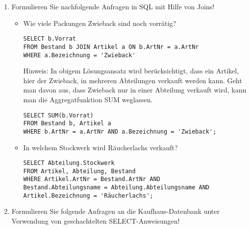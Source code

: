 \documentclass{lehramt-informatik-aufgabe}
\begin{document}
\begin{enumerate}


\item Formulieren Sie nachfolgende Anfragen in SQL mit Hilfe von Joins!

\begin{itemize}


\item Wie viele Packungen Zwieback sind noch vorrätig?

\begin{antwort}[richtig]
\begin{verbatim}
SELECT b.Vorrat
FROM Bestand b JOIN Artikel a ON b.ArtNr = a.ArtNr
WHERE a.Bezeichnung = 'Zwieback'
\end{verbatim}
\end{antwort}

\begin{antwort}[muster]
Hinweis: In obigem Lösungsansatz wird berücksichtigt, dass ein Artikel,
hier der Zwieback, in mehreren Abteilungen verkauft werden kann. Geht
man davon aus, dass Zwieback nur in einer Abteilung verkauft wird, kann
man die Aggregatfunktion SUM weglassen.
\begin{verbatim}
SELECT SUM(b.Vorrat)
FROM Bestand b, Artikel a
WHERE b.ArtNr = a.ArtNr AND a.Bezeichnung = 'Zwieback';
\end{verbatim}
\end{antwort}


\item In welchem Stockwerk wird Räucherlachs verkauft?

\begin{antwort}[muster]
\begin{verbatim}
SELECT Abteilung.Stockwerk
FROM Artikel, Abteilung, Bestand
WHERE Artikel.ArtNr = Bestand.ArtNr AND
Bestand.Abteilungsname = Abteilung.Abteilungsname AND
Artikel.Bezeichnung = 'Räucherlachs';
\end{verbatim}
\end{antwort}

\end{itemize}


\item Formulieren Sie folgende Anfragen an die Kaufhaus-Datenbank unter
Verwendung von geschachtelten SELECT-Anweisungen!


\end{enumerate}
\end{document}
